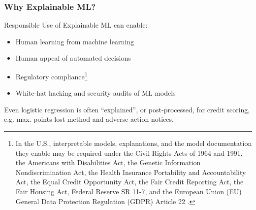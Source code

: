 \documentclass[11pt,
               aspectratio=169,
               hyperref={colorlinks}
               ]{beamer}
\begin{document}
	\begin{frame}
	
		\frametitle{Why Explainable ML?}
		
		Responsible Use of Explainable ML can enable:
		\begin{itemize}
			\item Human learning from machine learning
			\item Human appeal of automated decisions
			\item Regulatory compliance\footnote{\tiny{In the U.S., interpretable models, explanations, and the model documentation they enable may be required under the Civil Rights Acts of 1964 and 1991, the Americans with Disabilities Act, the Genetic Information Nondiscrimination Act, the Health Insurance Portability and Accountability Act, the Equal Credit Opportunity Act, the Fair Credit Reporting Act, the Fair Housing Act, Federal Reserve SR 11-7, and the European Union (EU) General Data Protection Regulation (GDPR) Article 22 \cite{ff_interpretability}.}}
			\item White-hat hacking and security audits of ML models
		\end{itemize}
		\vspace{10pt}
		Even logistic regression is often ``explained'',  or post-processed, for credit scoring, e.g. max. points lost method and adverse action notices.

	\end{frame}
\end{document}
